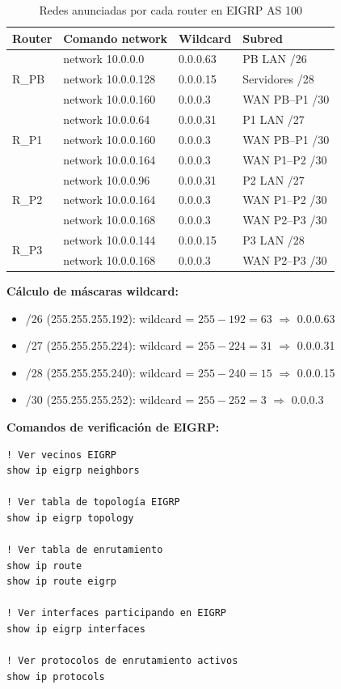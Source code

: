 \documentclass[letterpaper,11pt]{article}
\begin{document}
\begin{table}[H]
\centering
\caption{Redes anunciadas por cada router en EIGRP AS 100}
\small
\renewcommand{\arraystretch}{1.2}
\begin{tabular}{|l|l|l|l|}
\hline
\textbf{Router} & \textbf{Comando network} & \textbf{Wildcard} & \textbf{Subred} \\
\hline
\multirow{3}{*}{R\_PB} & network 10.0.0.0 & 0.0.0.63 & PB LAN /26 \\
\cline{2-4}
 & network 10.0.0.128 & 0.0.0.15 & Servidores /28 \\
\cline{2-4}
 & network 10.0.0.160 & 0.0.0.3 & WAN PB--P1 /30 \\
\hline
\multirow{3}{*}{R\_P1} & network 10.0.0.64 & 0.0.0.31 & P1 LAN /27 \\
\cline{2-4}
 & network 10.0.0.160 & 0.0.0.3 & WAN PB--P1 /30 \\
\cline{2-4}
 & network 10.0.0.164 & 0.0.0.3 & WAN P1--P2 /30 \\
\hline
\multirow{3}{*}{R\_P2} & network 10.0.0.96 & 0.0.0.31 & P2 LAN /27 \\
\cline{2-4}
 & network 10.0.0.164 & 0.0.0.3 & WAN P1--P2 /30 \\
\cline{2-4}
 & network 10.0.0.168 & 0.0.0.3 & WAN P2--P3 /30 \\
\hline
\multirow{2}{*}{R\_P3} & network 10.0.0.144 & 0.0.0.15 & P3 LAN /28 \\
\cline{2-4}
 & network 10.0.0.168 & 0.0.0.3 & WAN P2--P3 /30 \\
\hline
\end{tabular}
\end{table}

\textbf{Cálculo de máscaras wildcard:}
\begin{itemize}
    \item /26 (255.255.255.192): wildcard = $255 - 192 = 63$ $\Rightarrow$ 0.0.0.63
    \item /27 (255.255.255.224): wildcard = $255 - 224 = 31$ $\Rightarrow$ 0.0.0.31
    \item /28 (255.255.255.240): wildcard = $255 - 240 = 15$ $\Rightarrow$ 0.0.0.15
    \item /30 (255.255.255.252): wildcard = $255 - 252 = 3$ $\Rightarrow$ 0.0.0.3
\end{itemize}

\textbf{Comandos de verificación de EIGRP:}

\begin{lstlisting}[style=cisco, caption={Verificación de EIGRP}]
! Ver vecinos EIGRP
show ip eigrp neighbors

! Ver tabla de topología EIGRP
show ip eigrp topology

! Ver tabla de enrutamiento
show ip route
show ip route eigrp

! Ver interfaces participando en EIGRP
show ip eigrp interfaces

! Ver protocolos de enrutamiento activos
show ip protocols
\end{lstlisting}
\end{document}
